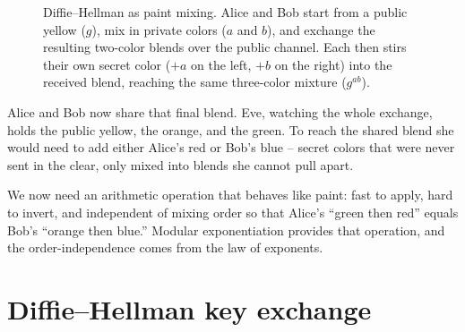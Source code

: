 \begin{figure}[!htbp]
\caption{Diffie--Hellman as paint mixing. Alice and Bob start from a public yellow ($g$), mix in private colors ($a$ and $b$), and exchange the resulting two-color blends over the public channel. Each then stirs their own secret color ($+a$ on the left, $+b$ on the right) into the received blend, reaching the same three-color mixture ($g^{ab}$).}
\label{ch18:fig-paint}
\end{figure}

Alice and Bob now share that final blend. Eve, watching the whole exchange, holds the public yellow, the orange, and the green. To reach the shared blend she would need to add either Alice's red or Bob's blue -- secret colors that were never sent in the clear, only mixed into blends she cannot pull apart.

We now need an arithmetic operation that behaves like paint: fast to apply, hard to invert, and independent of mixing order so that Alice's ``green then red'' equals Bob's ``orange then blue.'' Modular exponentiation provides that operation, and the order-independence comes from the law of exponents.

\section{Diffie--Hellman key exchange}
\label{ch18:dh-protocol}

